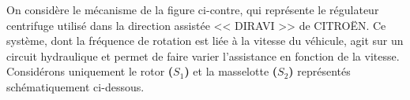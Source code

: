 \documentclass[10pt,fleqn]{article} %
\begin{document}
\def\pathfig{images}

\vspace{5cm}
\pagestyle{fancy}
\thispagestyle{plain}

\def\columnseprulecolor{\color{ocre}}
\setlength{\columnseprule}{0.4pt} 

\def\pathfig{images}

\ifprof
\else
\begin{multicols}{2}
\fi



On considère le mécanisme de la figure ci-contre, qui représente le régulateur centrifuge utilisé dans la direction assistée << DIRAVI >> de CITROËN. Ce système, dont la fréquence de rotation est liée à la vitesse du véhicule, agit sur un circuit hydraulique et permet de faire varier l’assistance en fonction de la vitesse.
Considérons uniquement le rotor \textbf{($S_1$)} et la masselotte \textbf{($S_2$)} représentés schématiquement ci-dessous.


\end{multicols}
\end{document}
